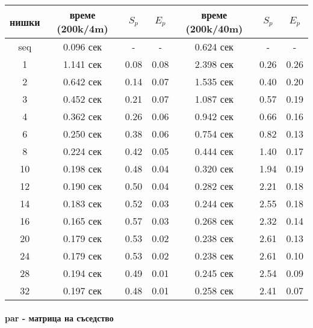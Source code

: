 \begin{center}
\begin{tabular}{ c | c c c | c c c | }
  нишки & време (200k/4m) & $S_p$ & $E_p$ & време (200k/40m) & $S_p$ & $E_p$ \\
  \hline
  seq & 0.096 сек & - & - & 0.624 сек & - & - \\
  1  & 1.141 сек & 0.08 & 0.08 & 2.398 сек & 0.26 & 0.26 \\
  2  & 0.642 сек & 0.14 & 0.07 & 1.535 сек & 0.40 & 0.20 \\
  3  & 0.452 сек & 0.21 & 0.07 & 1.087 сек & 0.57 & 0.19 \\
  4  & 0.362 сек & 0.26 & 0.06 & 0.942 сек & 0.66 & 0.16 \\
  6  & 0.250 сек & 0.38 & 0.06 & 0.754 сек & 0.82 & 0.13 \\
  8  & 0.224 сек & 0.42 & 0.05 & 0.444 сек & 1.40 & 0.17 \\
  10 & 0.198 сек & 0.48 & 0.04 & 0.320 сек & 1.94 & 0.19 \\
  12 & 0.190 сек & 0.50 & 0.04 & 0.282 сек & 2.21 & 0.18 \\
  14 & 0.183 сек & 0.52 & 0.03 & 0.244 сек & 2.55 & 0.18 \\
  16 & 0.165 сек & 0.57 & 0.03 & 0.268 сек & 2.32 & 0.14 \\
  20 & 0.179 сек & 0.53 & 0.02 & 0.238 сек & 2.61 & 0.13 \\
  24 & 0.179 сек & 0.53 & 0.02 & 0.238 сек & 2.61 & 0.10 \\
  28 & 0.194 сек & 0.49 & 0.01 & 0.245 сек & 2.54 & 0.09 \\
  32 & 0.197 сек & 0.48 & 0.01 & 0.258 сек & 2.41 & 0.07 \\
\end{tabular}
\end{center}

\paragraph*{par - матрица на съседство}

